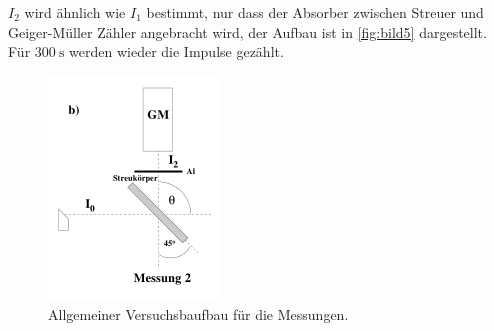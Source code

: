 $I_2$ wird ähnlich wie $I_1$ bestimmt, nur dass der Absorber zwischen Streuer und Geiger-Müller Zähler angebracht wird, der Aufbau ist in \autoref{fig:bild5} dargestellt.
Für $\SI{300}{\second}$ werden wieder die Impulse gezählt.

\begin{figure}
    \centering
    \includegraphics[width=\textwidth/2]{images/bild5.png}
    \caption{Allgemeiner Versuchsbaufbau für die Messungen. \cite{V603}}
    \label{fig:bild5}
\end{figure}